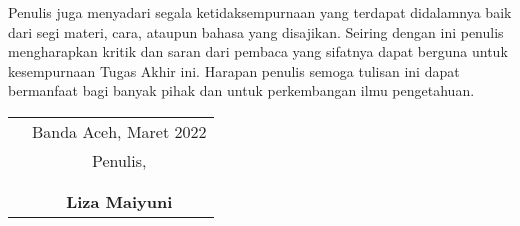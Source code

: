 
Penulis juga menyadari segala ketidaksempurnaan yang terdapat didalamnya baik dari segi materi, cara, ataupun bahasa yang disajikan. Seiring dengan ini penulis mengharapkan kritik dan saran dari pembaca yang sifatnya dapat berguna untuk kesempurnaan Tugas Akhir ini. Harapan penulis semoga tulisan ini dapat bermanfaat bagi banyak pihak dan untuk perkembangan ilmu pengetahuan.

\vspace{0.5cm}


\begin{tabular}{p{7.5cm}c}
	 & Banda Aceh, Maret 2022 \\
	 & Penulis,               \\
	 &                        \\
	 &                        \\
	 & \textbf{Liza Maiyuni}
\end{tabular}